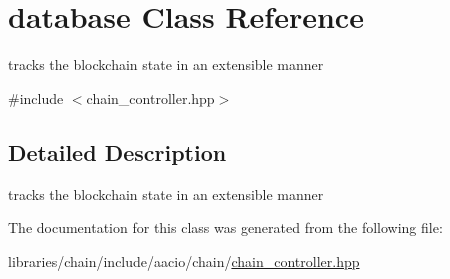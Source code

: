 \hypertarget{classdatabase}{}\section{database Class Reference}
\label{classdatabase}


tracks the blockchain state in an extensible manner  




{\ttfamily \#include $<$chain\+\_\+controller.\+hpp$>$}



\subsection{Detailed Description}
tracks the blockchain state in an extensible manner 

The documentation for this class was generated from the following file\+:\begin{DoxyCompactItemize}
\item 
libraries/chain/include/aacio/chain/\mbox{\hyperlink{chain__controller_8hpp}{chain\+\_\+controller.\+hpp}}\end{DoxyCompactItemize}
